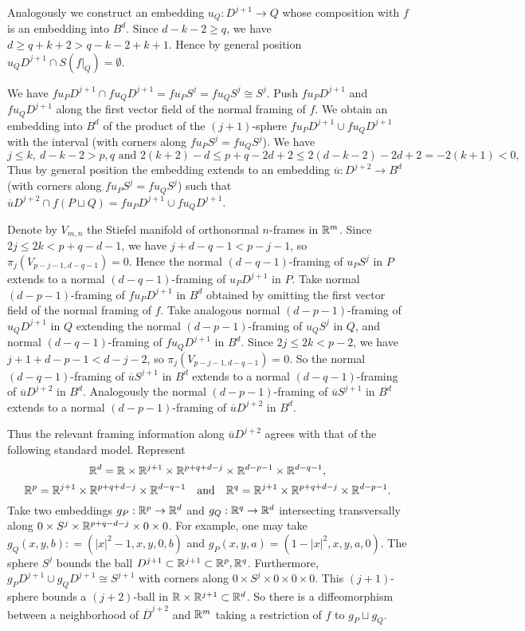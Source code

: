 \documentclass[12pt]{article}
\theoremstyle{plain}
\theoremstyle{definition}
\begin{document}
Analogously we construct an embedding $u_Q:D^{j+1}\to Q$  whose composition with $f$ is  an embedding into $B^d$.
Since $d-k-2\ge q$, we have $d\ge q+k+2>q-k-2+k+1$.
Hence by general position $u_QD^{j+1}\cap S(f|_Q)=\emptyset$.

We have $fu_PD^{j+1}\cap fu_QD^{j+1}=fu_PS^j=fu_QS^j\cong S^j$.
Push $fu_PD^{j+1}$ and $fu_QD^{j+1}$ along the first vector field of the normal framing of $f$.
We obtain an embedding into $B^d$ of the product of the $(j+1)$-sphere $fu_PD^{j+1}\cup fu_QD^{j+1}$ with the interval (with corners along $fu_PS^j=fu_QS^j$).
We have
$$j\le k,\ d-k-2>p,q\text{ and }2(k+2)-d\le p+q-2d+2\le2(d-k-2)-2d+2=-2(k+1)<0,$$
Thus by general position the embedding extends to an embedding $\overline u:D^{j+2}\to B^d$ (with corners along $fu_PS^j=fu_QS^j$) such that $\overline uD^{j+2}\cap f(P\sqcup Q)=fu_PD^{j+1}\cup fu_QD^{j+1}$.


Denote by $V_{m,n}$ the Stiefel manifold of orthonormal $n$-frames in ${\mathbb R}^m$.
Since $2j\le 2k<p+q-d-1$, we have $j+d-q-1<p-j-1$, so $\pi_j(V_{p-j-1,d-q-1})=0$.
Hence the normal $(d-q-1)$-framing of $u_PS^j$ in $P$ extends to a normal $(d-q-1)$-framing of $u_PD^{j+1}$ in $P$.
Take normal $(d-p-1)$-framing of $fu_PD^{j+1}$ in $B^d$ obtained by omitting the first vector field of the normal framing of $f$.
Take analogous normal $(d-p-1)$-framing of $u_QD^{j+1}$ in $Q$ extending the normal $(d-p-1)$-framing of $u_QS^j$ in $Q$, and normal $(d-q-1)$-framing of $fu_QD^{j+1}$ in $B^d$.
Since $2j\le 2k<p-2$, we have $j+1+d-p-1<d-j-2$, so $\pi_j(V_{p-j-1,d-q-1})=0$.
So the normal $(d-q-1)$-framing of $\overline uS^{j+1}$ in $B^d$ extends to a normal $(d-q-1)$-framing of $\overline uD^{j+2}$ in $B^d$.
Analogously the normal $(d-p-1)$-framing of $\overline uS^{j+1}$ in $B^d$ extends to a normal $(d-p-1)$-framing of $\overline uD^{j+2}$ in $B^d$.

Thus the relevant framing information along $\overline uD^{j+2}$ agrees with that of the following standard model.
Represent
$${\mathbb R}^d={\mathbb R}\times{\mathbb R}^{j+1}\times{\mathbb R}^{p+q+d-j}\times{\mathbb R}^{d-p-1}\times{\mathbb R}^{d-q-1},$$
$${\mathbb R}^p={\mathbb R}^{j+1}\times{\mathbb R}^{p+q+d-j}\times{\mathbb R}^{d-q-1}\quad\text{and}\quad {\mathbb R}^q={\mathbb R}^{j+1}\times{\mathbb R}^{p+q+d-j}\times{\mathbb R}^{d-p-1}.$$
Take two embeddings $g_P:{\mathbb R}^p\to{\mathbb R}^d$ and $g_Q:{\mathbb R}^q\to{\mathbb R}^d$ intersecting transversally along
$0\times S^j\times{\mathbb R}^{p+q-d-j}\times0\times0$.
For example, one may take $g_Q(x, y,b): =(|x|^2 - 1, x, y, 0, b)$ and $g_P(x, y, a) = (1 - |x|^2, x, y, a, 0)$. The sphere $S^j$ bounds the ball $D^{j+1}\subset{\mathbb R}^{j+1}\subset{\mathbb R}^p,{\mathbb R}^q$.
Furthermore, $g_PD^{j+1}\cup g_QD^{j+1}\cong S^{j+1}$ with corners along $0\times S^j\times 0\times0\times0$.
This $(j+1)$-sphere bounds a $(j+2)$-ball in ${\mathbb R}\times{\mathbb R}^{j+1}\subset{\mathbb R}^d$.
So there is a diffeomorphism between a neighborhood of $\overline D^{j+2}$ and ${\mathbb R}^m$ taking a restriction of $f$ to $g_P\sqcup g_Q$.
\end{document}
